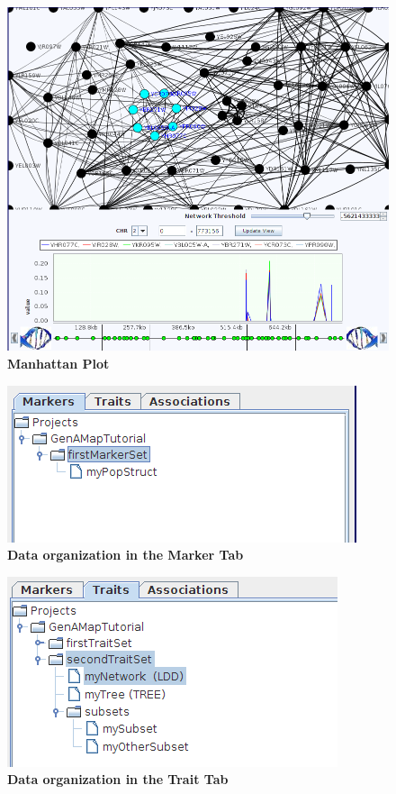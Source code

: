 \documentclass{article}
\begin{document}
\begin{figure}
\includegraphics[width=\textwidth]{manhattan.png}
\caption{\textbf{Manhattan Plot}}
\label{manhattan}
\end{figure}


\pagebreak
\clearpage

\begin{figure}
\includegraphics[width=\textwidth]{markerTab.png}
\caption{\textbf{Data organization in the Marker Tab}}
\label{markerTab}
\end{figure}

\begin{figure}
\includegraphics[width=\textwidth]{traitTab.png}
\caption{\textbf{Data organization in the Trait Tab}}
\label{traitTab}
\end{figure}
\end{document}
